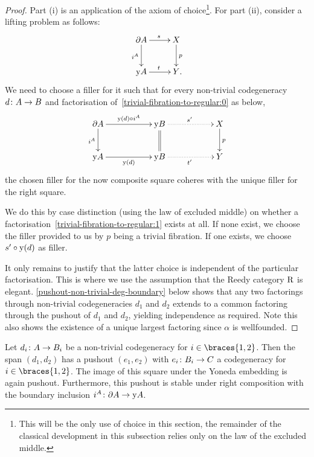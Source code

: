 \documentclass[reqno,10pt,a4paper,oneside,draft]{amsart}
\begin{document}
\begin{proof} Part (i) is an application of the axiom of choice\footnote{This will be the only use of choice in this section, the remainder of the classical development in this subsection relies only on the law of the excluded middle.}.
For part (ii), consider a lifting problem as follows:
\begin{equation} \label{trivial-fibration-to-regular:0}
\xymatrix{
  \partial A
  \ar[d]_{i^A}
  \ar[r]^{s}
&
  X
  \ar[d]^{p}
\\
  \yon A
  \ar[r]^{t}
&
  Y \rlap{.}
}
\end{equation}
We need to choose a filler for it such that for every non-trivial codegeneracy $d \colon A \to B$ and factorisation of~\eqref{trivial-fibration-to-regular:0} as below,
\begin{equation} \label{trivial-fibration-to-regular:1}
\xymatrix@C+3em{
  \partial A
  \ar[r]^{\yon(d) \cc i^A}
  \ar[d]_{i^A}
&
  \yon B
  \ar@{.>}[r]^{s'}
  \ar@{=}[d]
&
  X
  \ar[d]^{p}
\\
  \yon A
  \ar[r]_{\yon(d)}
&
  \yon B
  \ar@{.>}[r]_{t'}
&
  Y
}
\end{equation}
the chosen filler for the now composite square coheres with the unique filler for the right square.

We do this by case distinction (using the law of excluded middle) on whether a factorisation~\eqref{trivial-fibration-to-regular:1} exists at all.
If none exist, we choose the filler provided to us by $p$ being a trivial fibration.
If one exists, we choose $s' \mathbin{\circ} \mathrm{y}(d)$ as filler.

It only remains to justify that the latter choice is independent of the particular factorisation.
This is where we use the assumption that the Reedy category $\mathrm{R}$ is elegant.
\cref{pushout-non-trivial-deg-boundary} below shows that any two factorings through non-trivial codegeneracies $d_1$ and $d_2$ extends to a common factoring through the pushout of $d_1$ and $d_2$, yielding independence as required.
Note this also shows the existence of a unique largest factoring since $\alpha$ is wellfounded.
\end{proof}

\begin{lemma}
\label{pushout-non-trivial-deg-boundary}
Let $d_i \colon A \to B_i$ be a non-trivial codegeneracy for $i \in \braces{1, 2}$.
Then the span $(d_1, d_2)$ has a pushout $(e_1, e_2)$ with $e_i \colon B_i \to C$ a codegeneracy for $i \in \braces{1, 2}$.
The image of this square under the Yoneda embedding is again pushout.
Furthermore, this pushout is stable under right composition with the boundary inclusion $i^A \colon \partial A \to \mathrm{y} A$.
\end{lemma}
\end{document}
